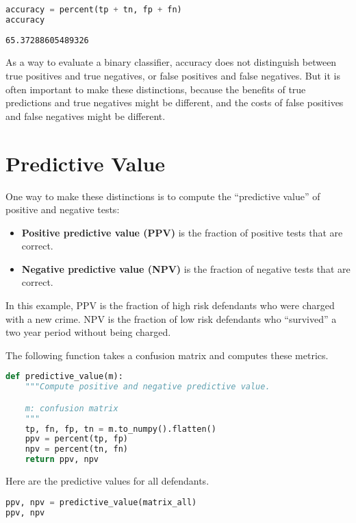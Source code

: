\begin{lstlisting}[language=Python,style=source]
accuracy = percent(tp + tn, fp + fn)
accuracy
\end{lstlisting}

\begin{lstlisting}[style=output]
65.37288605489326
\end{lstlisting}

As a way to evaluate a binary classifier, accuracy does not distinguish
between true positives and true negatives, or false positives and false
negatives. But it is often important to make these distinctions, because
the benefits of true predictions and true negatives might be different,
and the costs of false positives and false negatives might be different.

\section{Predictive Value}\label{predictive-value}

One way to make these distinctions is to compute the ``predictive
value'' of positive and negative tests:

\begin{itemize}
\item
  \textbf{Positive predictive value (PPV)} is the fraction of positive
  tests that are correct.
\item
  \textbf{Negative predictive value (NPV)} is the fraction of negative
  tests that are correct.
\end{itemize}

In this example, PPV is the fraction of high risk defendants who were
charged with a new crime. NPV is the fraction of low risk defendants who
``survived'' a two year period without being charged.

The following function takes a confusion matrix and computes these
metrics.

\begin{lstlisting}[language=Python,style=source]
def predictive_value(m):
    """Compute positive and negative predictive value.

    m: confusion matrix
    """
    tp, fn, fp, tn = m.to_numpy().flatten()
    ppv = percent(tp, fp)
    npv = percent(tn, fn)
    return ppv, npv
\end{lstlisting}

Here are the predictive values for all defendants.

\begin{lstlisting}[language=Python,style=source]
ppv, npv = predictive_value(matrix_all)
ppv, npv
\end{lstlisting}

